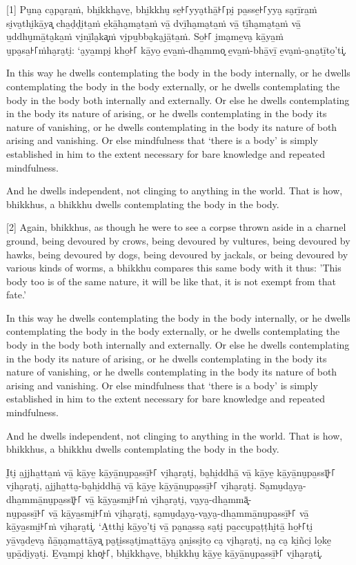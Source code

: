 [1] Pu̮na̮ ca̮pa̮ra̱ṁ, bhi̱kkha̮ve̱, bhi̱kkhu̮ se̱꜔꜒yya̮thā̱꜔꜒pi̮ pa̱sse̱꜔꜒yya̮ sa̮rī̱ra̱ṁ si̮va̮thi̮kā̱ya͓
cha̱ḍḍi̮ta̱ṁ e̱kā̱ha̮ma̮ta̱ṁ vā̱ dvī̱ha̮ma̮ta̱ṁ vā̱ tī̱ha̮ma̮ta̱ṁ vā̱ u̱ddhu̮mā̱ta̮ka̱ṁ vi̮nī̱la̮ka͓ṁ
vi̮pu̱bba̮ka̮jā̱ta̱ṁ. So̱꜔꜒ i̮ma̮me̱va̮ kā̱ya̱ṁ u̮pa̮sa̱꜔꜒ṁha̮ra̮ti̮: ‘a̮ya̱mpi̮ kho̱꜔꜒ kā̱yo̱ e̱va̱ṁ-dha̱mmo͓
e̱va̱ṁ-bhā̱vī̱ e̱va̮ṁ-a̮na̮tī̱to̱’ti͓.

\englishPage

In this way he dwells contemplating the body in the body internally, or he
dwells contemplating the body in the body externally, or he dwells contemplating
the body in the body both internally and externally. Or else he dwells
contemplating in the body its nature of arising, or he dwells contemplating in
the body its nature of vanishing, or he dwells contemplating in the body its
nature of both arising and vanishing. Or else mindfulness that ‘there is a body’
is simply established in him to the extent necessary for bare knowledge and
repeated mindfulness.

And he dwells independent, not clinging to anything in the world. That is how,
bhikkhus, a bhikkhu dwells contemplating the body in the body.

[2] Again, bhikkhus, as though he were to see a corpse thrown aside in a charnel
ground, being devoured by crows, being devoured by vultures, being devoured by
hawks, being devoured by dogs, being devoured by jackals, or being devoured by
various kinds of worms, a bhikkhu compares this same body with it thus: 'This
body too is of the same nature, it will be like that, it is not exempt from that
fate.'

In this way he dwells contemplating the body in the body internally, or he
dwells contemplating the body in the body externally, or he dwells contemplating
the body in the body both internally and externally. Or else he dwells
contemplating in the body its nature of arising, or he dwells contemplating in
the body its nature of vanishing, or he dwells contemplating in the body its
nature of both arising and vanishing. Or else mindfulness that ‘there is a body’
is simply established in him to the extent necessary for bare knowledge and
repeated mindfulness.

And he dwells independent, not clinging to anything in the world. That is how,
bhikkhus, a bhikkhu dwells contemplating the body in the body.

\paliPage

I̮ti̮ a̱jjha̱tta̱ṁ vā̱ kā̱ye̱ kā̱yā̱nu̮pa̱ssī̱꜔꜒ vi̮ha̮ra̮ti̮, ba̮hi̱ddhā̱ vā̱ kā̱ye̱ kā̱yā̱nu̮pa̱ssī͓꜔꜒
vi̮ha̮ra̮ti̮, a̱jjha̱tta̮-ba̮hi̱ddhā̱ vā̱ kā̱ye̱ kā̱yā̱nu̮pa̱ssī̱꜔꜒ vi̮ha̮ra̮ti̮. Sa̮mu̮da̮ya̮-dha̱mmā̱nu̮pa̱ssī͓꜔꜒
vā̱ kā̱ya̱smi̱꜔꜒ṁ vi̮ha̮ra̮ti̮, va̮ya̮-dha̱mmā͓-\\
nu̮pa̱ssī̱꜔꜒ vā̱ kā̱ya̱smi̱꜔꜒ṁ vi̮ha̮ra̮ti̮, sa̮mu̮da̮ya̮-va̮ya̮-dha̱mmā̱nu̮pa̱ssī̱꜔꜒ vā̱ kā̱ya̱smi̱꜔꜒ṁ vi̮ha̮ra̮ti͓.
‘A̱tthi̮ kā̱yo̱’ti̮ vā̱ pa̮na̱ssa̮ sa̮ti̮ pa̱ccu̮pa̱ṭṭhi̮tā̱ ho̱꜔꜒ti̮ yā̱va̮de̱va̮ ñā̱ṇa̮ma̱ttā̱ya͓
pa̮ṭi̱ssa̮ti̮ma̱ttā̱ya̮ a̮ni̱ssi̮to̱ ca̮ vi̮ha̮ra̮ti̮, na̮ ca̮ ki̱ñci̮ lo̱ke̱ u̮pā̱di̮ya̮ti̮. E̱va̱mpi̮ kho͓꜔꜒,
bhi̱kkha̮ve̱, bhi̱kkhu̮ kā̱ye̱ kā̱yā̱nu̮pa̱ssī̱꜔꜒ vi̮ha̮ra̮ti͓.

